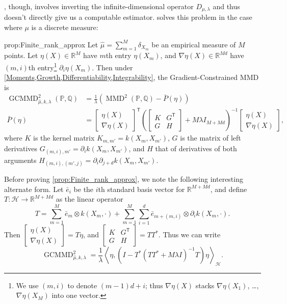 \documentclass{article}
\newcommand{\h}{\mathcal H}
\newcommand{\R}{\mathbb R}
\newcommand{\PP}{\mathbb P}
\newcommand{\QQ}{\mathbb Q}
\newcommand{\tp}{^\mathsf{T}}
\DeclareMathOperator{\MMD}{MMD}
\DeclareMathOperator{\GCMMD}{GCMMD}
\begin{document}
, though, involves inverting the infinite-dimensional operator $D_{\mu,\lambda}$
and thus doesn't directly give us a computable estimator.
 solves this problem in the case where $\mu$ is a discrete measure:
\begin{repprop}{prop:Finite_rank_approx}
  Let $\hat\mu = \sum_{m=1}^M \delta_{X_m}$ be an empirical measure of $M$ points.
  Let $\eta(X) \in \R^M$ have $m$th entry $\eta(X_m)$,
  and $\nabla \eta(X) \in \R^{M d}$ have $(m, i)$th entry\footnote{We use $(m, i)$ to denote $(m-1) d + i$;
    thus $\nabla \eta(X)$ stacks $\nabla \eta(X_1)$, \dots, $\nabla \eta(X_M)$ into one vector.
  } $\partial_i \eta(X_m)$.
  Then under \cref{Moments,Growth,Differentiability,Integrability},
  the Gradient-Constrained MMD is
  \begin{align*}
    \GCMMD_{\hat\mu,k,\lambda}^2(\PP, \QQ)
    &= \frac1\lambda \left( \MMD^{2}(\PP, \QQ) - \bar{P}(\eta) \right)
  \\
    \bar{P}(\eta)
    &=
    \begin{bmatrix} \eta(X) \\ \nabla\eta(X) \end{bmatrix}\tp
    \left(
      \begin{bmatrix}
        K & G\tp \\
        G & H
      \end{bmatrix}
      + M \lambda I_{M + M d}
    \right)^{-1}
    \begin{bmatrix} \eta(X) \\ \nabla\eta(X) \end{bmatrix}
    \label{eq:Sobolev-penalty}
  ,\end{align*}
  where $K$ is the kernel matrix $K_{m,m'} = k(X_m, X_{m'})$,
  $G$ is the matrix of left derivatives $G_{(m, i), m'} = \partial_i k(X_m, X_{m'})$,
  and $H$ that of derivatives of both arguments $H_{(m, i), (m', j)} = \partial_i \partial_{j+d} k(X_m, X_{m'})$.
\end{repprop}

Before proving \cref{prop:Finite_rank_approx},
we note the following interesting alternate form.
Let $\bar e_i$ be the $i$th standard basis vector for $\R^{M + M d}$,
and define $T : \h \to \R^{M + M d}$ as the linear operator
\[
  T = \sum_{m=1}^M \bar e_m \otimes k(X_m, \cdot)
    + \sum_{m=1}^M \sum_{i=1}^d \bar e_{m + (m, i)} \otimes \partial_i k(X_m, \cdot)
.\]
Then $\begin{bmatrix}\eta(X) \\ \nabla \eta(X) \end{bmatrix} = T \eta$,
and $\begin{bmatrix}K & G\tp \\ G & H \end{bmatrix} = T T^*$.
Thus we can write
\[
  \GCMMD_{\hat\mu,k,\lambda}^2
  = \frac1\lambda \left\langle \eta, \left( I - T^* (T T^* + M \lambda I)^{-1} T \right) \eta \right\rangle_\h
.\]
\end{document}
